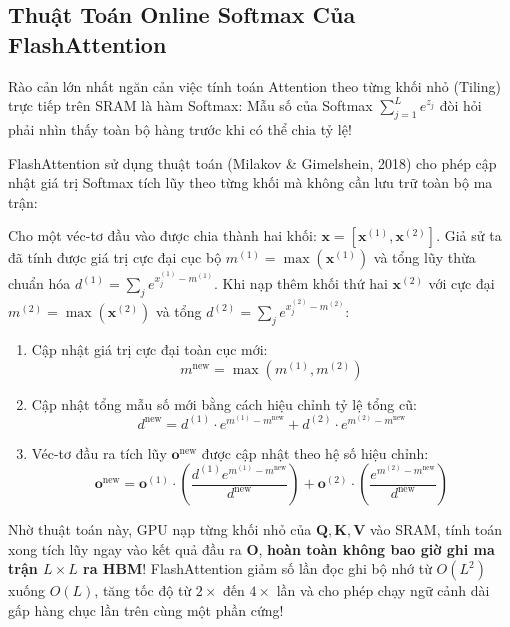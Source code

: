 \subsection{Thuật Toán Online Softmax Của FlashAttention}
Rào cản lớn nhất ngăn cản việc tính toán Attention theo từng khối nhỏ (Tiling) trực tiếp trên SRAM là hàm Softmax: Mẫu số của Softmax $\sum_{j=1}^L e^{z_j}$ đòi hỏi phải nhìn thấy toàn bộ hàng trước khi có thể chia tỷ lệ!

FlashAttention sử dụng thuật toán  (Milakov \& Gimelshein, 2018) cho phép cập nhật giá trị Softmax tích lũy theo từng khối mà không cần lưu trữ toàn bộ ma trận:

\begin{definition}
Cho một véc-tơ đầu vào được chia thành hai khối: $\mathbf{x} = [\mathbf{x}^{(1)}, \mathbf{x}^{(2)}]$.
Giả sử ta đã tính được giá trị cực đại cục bộ $m^{(1)} = \max(\mathbf{x}^{(1)})$ và tổng lũy thừa chuẩn hóa $d^{(1)} = \sum_j e^{x_j^{(1)} - m^{(1)}}$.
Khi nạp thêm khối thứ hai $\mathbf{x}^{(2)}$ với cực đại $m^{(2)} = \max(\mathbf{x}^{(2)})$ và tổng $d^{(2)} = \sum_j e^{x_j^{(2)} - m^{(2)}}$:
\begin{enumerate}
  \item Cập nhật giá trị cực đại toàn cục mới:
  \begin{equation}
  m^{\text{new}} = \max\left(m^{(1)}, m^{(2)}\right)
  \end{equation}
  \item Cập nhật tổng mẫu số mới bằng cách hiệu chỉnh tỷ lệ tổng cũ:
  \begin{equation}
  d^{\text{new}} = d^{(1)} \cdot e^{m^{(1)} - m^{\text{new}}} + d^{(2)} \cdot e^{m^{(2)} - m^{\text{new}}}
  \end{equation}
  \item Véc-tơ đầu ra tích lũy $\mathbf{o}^{\text{new}}$ được cập nhật theo hệ số hiệu chỉnh:
  \begin{equation}
  \mathbf{o}^{\text{new}} = \mathbf{o}^{(1)} \cdot \left(\frac{d^{(1)} e^{m^{(1)} - m^{\text{new}}}}{d^{\text{new}}}\right) + \mathbf{o}^{(2)} \cdot \left(\frac{e^{m^{(2)} - m^{\text{new}}}}{d^{\text{new}}}\right)
  \end{equation}
\end{enumerate}
\end{definition}

Nhờ thuật toán này, GPU nạp từng khối nhỏ của $\mathbf{Q}, \mathbf{K}, \mathbf{V}$ vào SRAM, tính toán xong tích lũy ngay vào kết quả đầu ra $\mathbf{O}$, \textbf{hoàn toàn không bao giờ ghi ma trận $L \times L$ ra HBM}! FlashAttention giảm số lần đọc ghi bộ nhớ từ $O(L^2)$ xuống $O(L)$, tăng tốc độ từ $2\times$ đến $4\times$ lần và cho phép chạy ngữ cảnh dài gấp hàng chục lần trên cùng một phần cứng!

